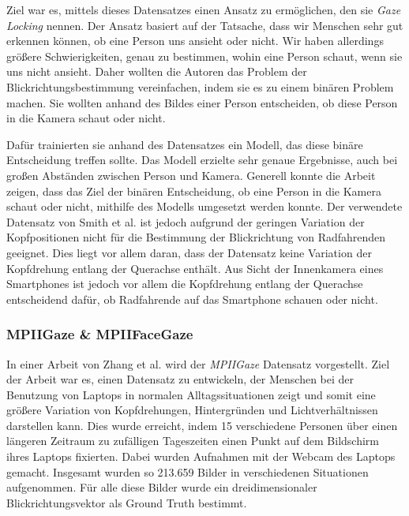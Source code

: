 Ziel war es, mittels dieses Datensatzes einen Ansatz zu ermöglichen, den sie \textit{Gaze Locking} \cite{paper:columbia} nennen. Der Ansatz basiert auf der Tatsache, dass wir Menschen sehr gut erkennen können, ob eine Person uns ansieht oder nicht. Wir haben allerdings größere Schwierigkeiten, genau zu bestimmen, wohin eine Person schaut, wenn sie uns nicht ansieht. Daher wollten die Autoren das Problem der Blickrichtungsbestimmung vereinfachen, indem sie es zu einem binären Problem machen. Sie wollten anhand des Bildes einer Person entscheiden, ob diese Person in die Kamera schaut oder nicht.

Dafür trainierten sie anhand des Datensatzes ein Modell, das diese binäre Entscheidung treffen sollte. Das Modell erzielte sehr genaue Ergebnisse, auch bei großen Abständen zwischen Person und Kamera. Generell konnte die Arbeit zeigen, dass das Ziel der binären Entscheidung, ob eine Person in die Kamera schaut oder nicht, mithilfe des Modells umgesetzt werden konnte.
Der verwendete Datensatz von Smith et al. ist jedoch aufgrund der geringen Variation der Kopfpositionen nicht für die Bestimmung der Blickrichtung von Radfahrenden geeignet. Dies liegt vor allem daran, dass der Datensatz keine Variation der Kopfdrehung entlang der Querachse enthält. Aus Sicht der Innenkamera eines Smartphones ist jedoch vor allem die Kopfdrehung entlang der Querachse entscheidend dafür, ob Radfahrende auf das Smartphone schauen oder nicht.

\subsubsection{MPIIGaze \& MPIIFaceGaze}\label{sec:related:gaze:appearance:mpiigaze}

In einer Arbeit von Zhang et al. \cite{paper:mpiigaze, paper:mpiigaze-old} wird der \textit{MPIIGaze} Datensatz vorgestellt. Ziel der Arbeit war es, einen Datensatz zu entwickeln, der Menschen bei der Benutzung von Laptops in normalen Alltagssituationen zeigt und somit eine größere Variation von Kopfdrehungen, Hintergründen und Lichtverhältnissen darstellen kann. Dies wurde erreicht, indem 15 verschiedene Personen über einen längeren Zeitraum zu zufälligen Tageszeiten einen Punkt auf dem Bildschirm ihres Laptops fixierten. Dabei wurden Aufnahmen mit der Webcam des Laptops gemacht. Insgesamt wurden so 213.659 Bilder in verschiedenen Situationen aufgenommen. Für alle diese Bilder wurde ein dreidimensionaler Blickrichtungsvektor als Ground Truth bestimmt. 

